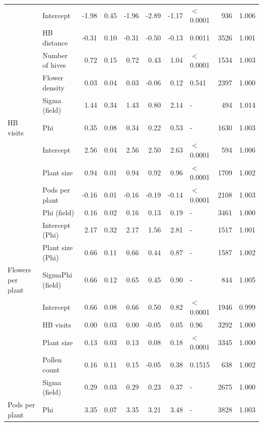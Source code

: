 \documentclass[12pt]{article} %
\begin{document}
\begin{longtable}{l|l|r|r|r|r|r|l|r|r}
\cline{1-10}
 & Intercept & -1.98 & 0.45 & -1.96 & -2.89 & -1.17 & $<$0.0001 & 936 & 1.006\\
\cline{2-10}
 & HB distance & -0.31 & 0.10 & -0.31 & -0.50 & -0.13 & 0.0011 & 3526 & 1.001\\
\cline{2-10}
 & Number of hives & 0.72 & 0.15 & 0.72 & 0.43 & 1.04 & $<$0.0001 & 1534 & 1.003\\
\cline{2-10}
 & Flower density & 0.03 & 0.04 & 0.03 & -0.06 & 0.12 & 0.541 & 2397 & 1.000\\
\cline{2-10}
 & Sigma (field) & 1.44 & 0.34 & 1.43 & 0.80 & 2.14 & - & 494 & 1.014\\
\cline{2-10}
\multirow{-6}{*}{\raggedright\arraybackslash HB visits} & Phi & 0.35 & 0.08 & 0.34 & 0.22 & 0.53 & - & 1630 & 1.003\\
\cline{1-10}
 & Intercept & 2.56 & 0.04 & 2.56 & 2.50 & 2.63 & $<$0.0001 & 594 & 1.006\\
\cline{2-10}
 & Plant size & 0.94 & 0.01 & 0.94 & 0.92 & 0.96 & $<$0.0001 & 1709 & 1.002\\
\cline{2-10}
 & Pods per plant & -0.16 & 0.01 & -0.16 & -0.19 & -0.14 & $<$0.0001 & 2108 & 1.003\\
\cline{2-10}
 & Phi (field) & 0.16 & 0.02 & 0.16 & 0.13 & 0.19 & - & 3461 & 1.000\\
\cline{2-10}
 & Intercept (Phi) & 2.17 & 0.32 & 2.17 & 1.56 & 2.81 & - & 1517 & 1.001\\
\cline{2-10}
 & Plant size (Phi) & 0.66 & 0.11 & 0.66 & 0.44 & 0.87 & - & 1587 & 1.002\\
\cline{2-10}
\multirow{-7}{*}{\raggedright\arraybackslash Flowers per plant} & SigmaPhi (field) & 0.66 & 0.12 & 0.65 & 0.45 & 0.90 & - & 844 & 1.005\\
\cline{1-10}
 & Intercept & 0.66 & 0.08 & 0.66 & 0.50 & 0.82 & $<$0.0001 & 1946 & 0.999\\
\cline{2-10}
 & HB visits & 0.00 & 0.03 & 0.00 & -0.05 & 0.05 & 0.96 & 3292 & 1.000\\
\cline{2-10}
 & Plant size & 0.13 & 0.03 & 0.13 & 0.08 & 0.18 & $<$0.0001 & 3345 & 1.000\\
\cline{2-10}
 & Pollen count & 0.16 & 0.11 & 0.15 & -0.05 & 0.38 & 0.1515 & 638 & 1.002\\
\cline{2-10}
 & Sigma (field) & 0.29 & 0.03 & 0.29 & 0.23 & 0.37 & - & 2675 & 1.000\\
\cline{2-10}
\multirow{-6}{*}{\raggedright\arraybackslash Pods per plant} & Phi & 3.35 & 0.07 & 3.35 & 3.21 & 3.48 & - & 3828 & 1.003\\

\end{longtable}
\end{document}
